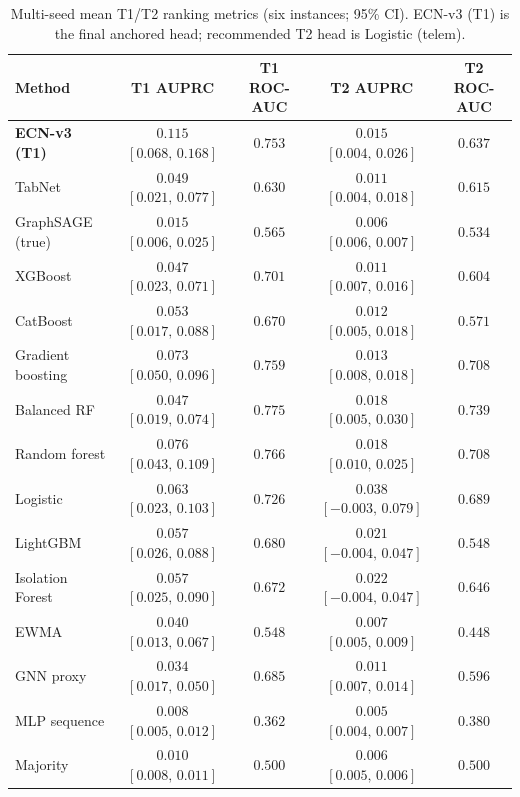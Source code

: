 \begin{table}[!t]
\centering
\caption{Multi-seed mean T1/T2 ranking metrics (six instances; 95\% CI). ECN-v3 (T1) is the final anchored head; recommended T2 head is Logistic (telem).}
\label{tab:t1t2}
\renewcommand{\arraystretch}{1.12}
\setlength{\tabcolsep}{3.5pt}
{\footnotesize
\begin{tabular*}{\textwidth}{@{\extracolsep{\fill}}lcccc}
\toprule
Method & T1 AUPRC & T1 ROC-AUC & T2 AUPRC & T2 ROC-AUC \\
\midrule
\textbf{ECN-v3 (T1)} & $\mathbf{0.115}$ $[0.068,\,0.168]$ & $\mathbf{0.753}$ & $0.015$ $[0.004,\,0.026]$ & $0.637$ \\
TabNet & $0.049$ $[0.021,\,0.077]$ & $0.630$ & $0.011$ $[0.004,\,0.018]$ & $0.615$ \\
GraphSAGE (true) & $0.015$ $[0.006,\,0.025]$ & $0.565$ & $0.006$ $[0.006,\,0.007]$ & $0.534$ \\
XGBoost & $0.047$ $[0.023,\,0.071]$ & $0.701$ & $0.011$ $[0.007,\,0.016]$ & $0.604$ \\
CatBoost & $0.053$ $[0.017,\,0.088]$ & $0.670$ & $0.012$ $[0.005,\,0.018]$ & $0.571$ \\
Gradient boosting & $0.073$ $[0.050,\,0.096]$ & $0.759$ & $0.013$ $[0.008,\,0.018]$ & $0.708$ \\
Balanced RF & $0.047$ $[0.019,\,0.074]$ & $0.775$ & $0.018$ $[0.005,\,0.030]$ & $0.739$ \\
Random forest & $0.076$ $[0.043,\,0.109]$ & $0.766$ & $0.018$ $[0.010,\,0.025]$ & $0.708$ \\
Logistic & $0.063$ $[0.023,\,0.103]$ & $0.726$ & $0.038$ $[-0.003,\,0.079]$ & $0.689$ \\
LightGBM & $0.057$ $[0.026,\,0.088]$ & $0.680$ & $0.021$ $[-0.004,\,0.047]$ & $0.548$ \\
Isolation Forest & $0.057$ $[0.025,\,0.090]$ & $0.672$ & $0.022$ $[-0.004,\,0.047]$ & $0.646$ \\
EWMA & $0.040$ $[0.013,\,0.067]$ & $0.548$ & $0.007$ $[0.005,\,0.009]$ & $0.448$ \\
GNN proxy & $0.034$ $[0.017,\,0.050]$ & $0.685$ & $0.011$ $[0.007,\,0.014]$ & $0.596$ \\
MLP sequence & $0.008$ $[0.005,\,0.012]$ & $0.362$ & $0.005$ $[0.004,\,0.007]$ & $0.380$ \\
Majority & $0.010$ $[0.008,\,0.011]$ & $0.500$ & $0.006$ $[0.005,\,0.006]$ & $0.500$ \\
\bottomrule
\end{tabular*}}
\end{table}
